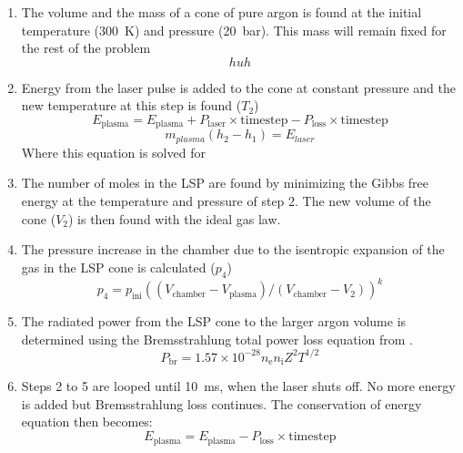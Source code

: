         \begin{enumerate}
            \item The volume and the mass of a cone of pure argon is found at the initial temperature (\qty{300}{K}) and pressure (\qty{20}{bar}). This mass will remain fixed for the rest of the problem
                \begin{equation}
                    huh
                \end{equation}
            \item Energy from the laser pulse is added to the cone at constant pressure and the new temperature at this step is found ($T_2$)
                \begin{equation}
                    E_\mathrm{plasma} = E_\mathrm{plasma} + P_\mathrm{laser} \times \mathrm{timestep} - P_\mathrm{loss} \times \mathrm{timestep}
                \end{equation}
                \begin{equation}
                    m_{plasma} (h_2 - h_1) = E_{laser}
                \end{equation}
                Where this equation is solved for 
            \item The number of moles in the LSP are found by minimizing the Gibbs free energy at the temperature and pressure of step 2. The new volume of the cone ($V_2$) is then found with the ideal gas law.
            \item The pressure increase in the chamber due to the isentropic expansion of the gas in the LSP cone is calculated ($p_4$)
                \begin{equation}
                    p_4 = p_\mathrm{ini} ((V_\mathrm{chamber} - V_\mathrm{plasma})/(V_\mathrm{chamber} - V_2))^k
                \end{equation}
            \item The radiated power from the LSP cone to the larger argon volume is determined using the Bremsstrahlung total power loss equation from \textcite{glasstoneControlledThermonuclearReactions1975}.
                \begin{equation}
                    P_\mathrm{br} = 1.57 \times 10^{-28} n_\mathrm{e} n_\mathrm{i} Z^2 T^{1/2}
                \end{equation}
            \item Steps 2 to 5 are looped until \qty{10}{ms}, when the laser shuts off. No more energy is added but Bremsstrahlung loss continues. The conservation of energy equation then becomes:
                \begin{equation}
                    E_\mathrm{plasma} = E_\mathrm{plasma} - P_\mathrm{loss} \times \mathrm{timestep}
                \end{equation}
        \end{enumerate}
        
